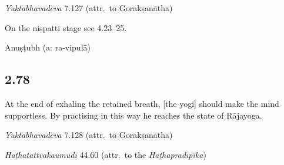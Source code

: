 \begin{ekdosis}
\begin{testimonia}[hp02_077]
\emph{Yuktabhavadeva} 7.127 (attr.~to Gorakṣanātha)

\begin{versinnote}
\end{versinnote}

\end{testimonia}

\begin{philcomm}[hp02_077]
On the niṣpatti stage see 4.23–25.
\end{philcomm}

\begin{metre}[hp02_077]
Anuṣṭubh (a: ra-vipulā)
\end{metre}

\subsection*{2.78}
\begin{translation}[hp02_078]
At the end of exhaling the retained breath, [the yogi] should make the mind supportless. By practising in this way he reaches the state of Rājayoga.
\end{translation}

\begin{testimonia}[hp02_078]
\emph{Yuktabhavadeva} 7.128 (attr.~to Gorakṣanātha)

\begin{versinnote}
\end{versinnote}

\emph{Haṭhatattvakaumudī} 44.60 (attr.~to the \emph{Haṭhapradīpika})

\begin{versinnote}
\end{versinnote}


\end{testimonia}
\end{ekdosis}
